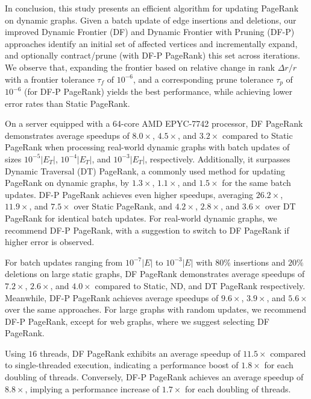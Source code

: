 In conclusion, this study presents an efficient algorithm for updating PageRank on dynamic graphs. Given a batch update of edge insertions and deletions, our improved Dynamic Frontier (DF) and Dynamic Frontier with Pruning (DF-P) approaches identify an initial set of affected vertices and incrementally expand, and optionally contract/prune (with DF-P PageRank) this set across iterations. We observe that, expanding the frontier based on relative change in rank $\Delta r/r$ with a frontier tolerance $\tau_f$ of $10^{-6}$, and a corresponding prune tolerance $\tau_p$ of $10^{-6}$ (for DF-P PageRank) yields the best performance, while achieving lower error rates than Static PageRank.

On a server equipped with a 64-core AMD EPYC-7742 processor, DF PageRank demonstrates average speedups of $8.0\times$, $4.5\times$, and $3.2\times$ compared to Static PageRank when processing real-world dynamic graphs with batch updates of sizes $10^{-5}|E_T|$, $10^{-4}|E_T|$, and $10^{-3}|E_T|$, respectively. Additionally, it surpasses Dynamic Traversal (DT) PageRank, a commonly used method for updating PageRank on dynamic graphs, by $1.3\times$, $1.1\times$, and $1.5\times$ for the same batch updates. DF-P PageRank achieves even higher speedups, averaging $26.2\times$, $11.9\times$, and $7.5\times$ over Static PageRank, and $4.2\times$, $2.8\times$, and $3.6\times$ over DT PageRank for identical batch updates. For real-world dynamic graphs, we recommend DF-P PageRank, with a suggestion to switch to DF PageRank if higher error is observed.

For batch updates ranging from $10^{-7}|E|$ to $10^{-3}|E|$ with $80\%$ insertions and $20\%$ deletions on large static graphs, DF PageRank demonstrates average speedups of $7.2\times$, $2.6\times$, and $4.0\times$ compared to Static, ND, and DT PageRank respectively. Meanwhile, DF-P PageRank achieves average speedups of $9.6\times$, $3.9\times$, and $5.6\times$ over the same approaches. For large graphs with random updates, we recommend DF-P PageRank, except for web graphs, where we suggest selecting DF PageRank.

Using $16$ threads, DF PageRank exhibits an average speedup of $11.5\times$ compared to single-threaded execution, indicating a performance boost of $1.8\times$ for each doubling of threads. Conversely, DF-P PageRank achieves an average speedup of $8.8\times$, implying a performance increase of $1.7\times$ for each doubling of threads.
